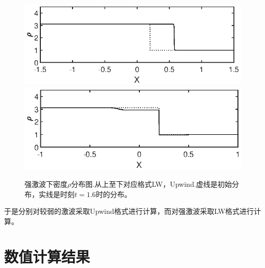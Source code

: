 \documentclass{article}
\begin{document}
\begin{figure}[H]
    \centering
    \includegraphics[width=.75\textwidth]{2.3LW.eps}
    \includegraphics[width=.75\textwidth]{2.3Up.eps}
    \caption{强激波下密度$\rho$分布图.从上至下对应格式LW，Upwind.虚线是初始分布，实线是时刻$t=1.6$时的分布。}
    \label{fig:2.3m}
\end{figure}
\par
于是分别对较弱的激波采取Upwind格式进行计算，而对强激波采取LW格式进行计算。
\section{数值计算结果}
\end{document}
